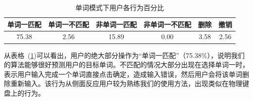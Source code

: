 \begin{table}[h]
  \centering
  \begin{minipage}[t]{0.9\linewidth} %
  \caption[单词模式下用户各行为百分比]{单词模式下用户各行为百分比}
  \label{tab:word-stat}
    \centering
    \begin{tabularx}{\linewidth}{cccccc}
      \toprule[1.5pt]
      单词一匹配 & 单词一不匹配 & 非单词一匹配 & 非单词一不匹配 & 删除 & 撤销\\\midrule[1pt]
      75.38 & 2.56 & 15.89 & 0.00 & 3.58 & 2.56\\
      \bottomrule[1.5pt]
    \end{tabularx}
  \end{minipage}
\end{table}

从表格~(\ref{tab:word-stat})可以看出，用户的绝大部分操作为“单词一匹配”（75.38\%），说明我们的算法能够很好预测用户的目标单词。不匹配的情况大部分出现在选择单词一时，表示用户输入完成一个单词直接点击确定，造成输入错误，然后用户会将该单词删除重新输入。该行为从侧面反应用户较为熟练我们的使用方法，出现类似在物理键盘上的行为。


